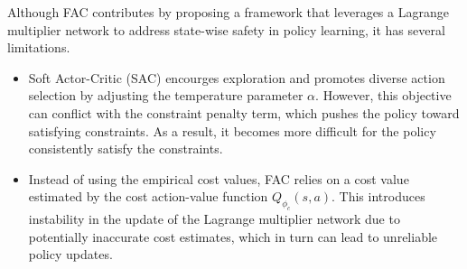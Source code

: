 \noindent Although FAC contributes by proposing a framework that leverages a Lagrange multiplier network to address state-wise safety in policy learning, it has several limitations.
\begin{itemize}
  \item 
  Soft Actor-Critic (SAC) encourges exploration and promotes diverse action selection by adjusting the temperature parameter $\alpha$. 
  However, this objective can conflict with the constraint penalty term, which pushes the policy toward satisfying constraints. 
  As a result, it becomes more difficult for the policy consistently satisfy the constraints.
  \item 
  Instead of using the empirical cost values, FAC relies on a cost value estimated by the cost action-value function $Q_{\phi_c}(s, a)$.
  This introduces instability in the update of the Lagrange multiplier network due to potentially inaccurate cost estimates, which in turn can lead to unreliable policy updates.
\end{itemize}